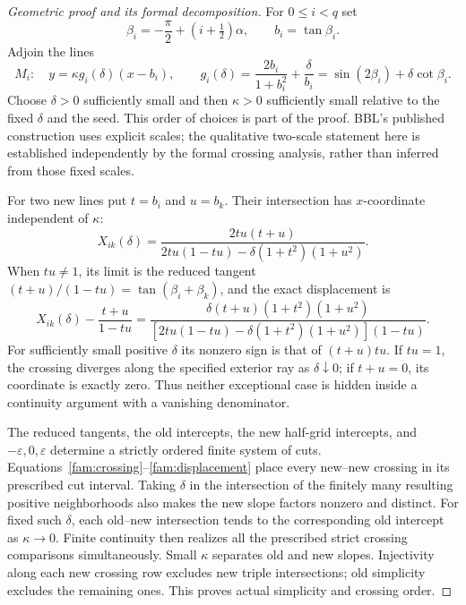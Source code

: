 \begin{proof}[Geometric proof and its formal decomposition]
For $0\leq i<q$ set
\[
 \beta_i=-\frac\pi2+(i+\tfrac12)\alpha,
 \qquad b_i=\tan\beta_i.
\]
Adjoin the lines
\begin{equation}
 M_i:\quad y=\kappa g_i(\delta)(x-b_i),\qquad
 g_i(\delta)=\frac{2b_i}{1+b_i^2}+\frac\delta{b_i}
            =\sin(2\beta_i)+\delta\cot\beta_i.
 \label{fam:pencil}
\end{equation}
Choose $\delta>0$ sufficiently small and then $\kappa>0$ sufficiently
small relative to the fixed $\delta$ and the seed.  This order of choices
is part of the proof.  BBL's published construction uses explicit scales;
the qualitative two-scale statement here is established independently
by the formal crossing analysis, rather than inferred from those fixed
scales.

For two new lines put $t=b_i$ and $u=b_k$.  Their intersection has
$x$-coordinate independent of $\kappa$:
\begin{equation}
 X_{ik}(\delta)=
 \frac{2tu(t+u)}{2tu(1-tu)-\delta(1+t^2)(1+u^2)}.
 \label{fam:crossing}
\end{equation}
When $tu\ne1$, its limit is the reduced tangent
$(t+u)/(1-tu)=\tan(\beta_i+\beta_k)$, and the exact displacement is
\begin{equation}
 X_{ik}(\delta)-\frac{t+u}{1-tu}
 =\frac{\delta(t+u)(1+t^2)(1+u^2)}
 {[2tu(1-tu)-\delta(1+t^2)(1+u^2)](1-tu)}.
 \label{fam:displacement}
\end{equation}
For sufficiently small positive $\delta$ its nonzero sign is that of
$(t+u)tu$.  If $tu=1$, the crossing diverges along the specified exterior
ray as $\delta\downarrow0$; if $t+u=0$, its coordinate is exactly zero.
Thus neither exceptional case is hidden inside a continuity argument
with a vanishing denominator.

The reduced tangents, the old intercepts, the new half-grid intercepts,
and $-\varepsilon,0,\varepsilon$ determine a strictly ordered finite
system of cuts.  Equations~\eqref{fam:crossing}--\eqref{fam:displacement}
place every new--new crossing in its prescribed cut interval.  Taking
$\delta$ in the intersection of the finitely many resulting positive
neighborhoods also makes the new slope factors nonzero and distinct.
For fixed such $\delta$, each old--new intersection tends to the
corresponding old intercept as $\kappa\to0$.  Finite continuity then
realizes all the prescribed strict crossing comparisons simultaneously.
Small $\kappa$ separates old and new slopes.  Injectivity along each new
crossing row excludes new triple intersections; old simplicity excludes
the remaining ones.  This proves actual simplicity and crossing order.


\end{proof}
